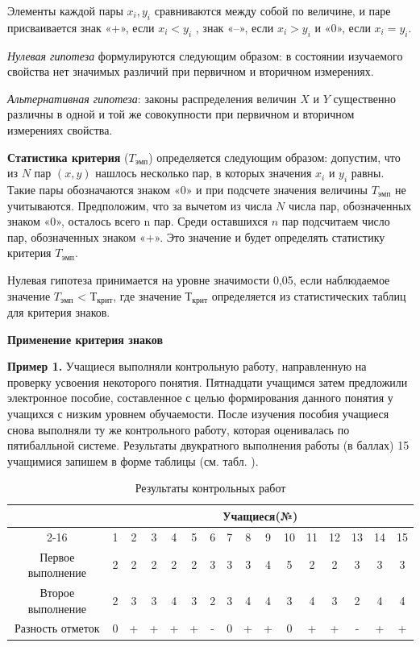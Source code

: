 \documentclass[12pt]{article}
\begin{document}
Элементы каждой пары $x_i, y_i$ сравниваются между собой по величине, и паре присваивается знак «+», если $x_i < y_i$ , знак «–», если $x_i > y_i$  и «0», если $x_i = y_i$.

\textit{Нулевая гипотеза} формулируются следующим образом: в состоянии изучаемого свойства нет значимых различий при первичном и вторичном измерениях.

\textit{Альтернативная гипотеза}: законы распределения величин $X$ и $Y$ существенно различны в одной и той же совокупности при первичном и вторичном измерениях свойства.

\bigskip
\textbf{Статистика критерия} ($T_{эмп}$) определяется следующим образом:
допустим, что из $N$ пар $(x, y)$ нашлось несколько пар, в которых значения $x_i$ и $y_i$ равны. Такие пары обозначаются знаком «0» и при подсчете значения величины $T_{эмп}$ не учитываются. Предположим, что за вычетом из числа $N$ числа пар, обозначенных знаком «0», осталось всего n пар. Среди оставшихся $n$ пар подсчитаем число пар, обозначенных знаком «+». Это значение и будет определять статистику критерия $T_{эмп}$.

Нулевая гипотеза принимается на уровне значимости 0,05, если наблюдаемое значение $T_{эмп}$ < $Т_{крит}$, где значение $Т_{крит}$ определяется из статистических таблиц для критерия знаков.

\medskip
\textbf{Применение критерия знаков}

\medskip
\textbf{Пример 1.} Учащиеся выполняли контрольную работу, направленную на проверку усвоения некоторого понятия. Пятнадцати учащимся затем предложили электронное пособие, составленное с целью формирования данного понятия у учащихся с низким уровнем обучаемости. После изучения пособия учащиеся снова выполняли ту же контрольного работу, которая оценивалась по пятибалльной системе.
Результаты двукратного выполнения работы (в баллах) 15 учащимися запишем в форме таблицы (см. табл. ).

\begin{table}[h]
    \centering
    \caption{Результаты контрольных работ}
    \bigskip
    \begin{tabular}{|c|c|c|c|c|c|c|c|c|c|c|c|c|c|c|c|} \hline
         \multirow{2}{*}{}&\multicolumn{15}{c|}{\textbf{Учащиеся(№)}} \\ \cline{2-16}
        &1&2&3&4&5&6&7&8&9&10&11&12&13&14&15 \\ \hline
        Первое выполнение&2&2&2&2&2&3&3&3&4&5&2&2&3&3&3 \\ \hline
        Второе выполнение&2&3&3&4&3&2&3&4&4&3&4&3&2&4&4 \\ \hline
        Разность отметок&0&+&+&+&+&-&0&+&+&0&+&+&-&+&+ \\ \hline
    \end{tabular}
\end{table}
\end{document}
